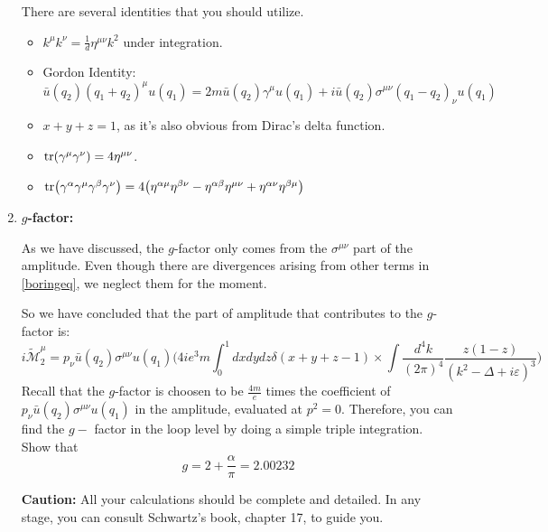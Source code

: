 \documentclass[11pt]{article}
\begin{document}
\begin{enumerate}
\begin{problem}{\points{-}}
	There are several identities that you should utilize.
	\begin{itemize}
		\item $k^\mu k^\nu = \frac{1}{d} \eta^{\mu\nu} k^2$ under integration.
		\item Gordon Identity:
		\[
		\bar{u}(q_2)(q_1+q_2)^\mu u(q_1) = 2m\bar{u}(q_2)\gamma^\mu u(q_1) + i \bar{u}(q_2) \sigma^{\mu\nu} (q_1-q_2)_\nu u(q_1) 
		\]
		\item $x+y+z=1$, as it's also obvious from Dirac's delta function.
		\item $\tr(\gamma^\mu\gamma^\nu) = 4\eta^{\mu\nu}$.
		\item $\tr (\gamma^\alpha\gamma^\mu\gamma^\beta\gamma^\nu) = 4\big(
		\eta^{\alpha\mu}\eta^{\beta\nu}-\eta^{\alpha\beta}\eta^{\mu\nu}+\eta^{\alpha\nu}\eta^{\beta\mu}
		\big)$
	\end{itemize}
		
\end{problem}

\item
\begin{problem}{\points{-}}
	\textbf{$g$-factor:}
	
	As we have discussed, the $g$-factor only comes from the $\sigma^{\mu\nu}$ part of the amplitude. Even though there are divergences arising from other terms in \ref{boringeq}, we neglect them for the moment.
	
	So we have concluded that the part of amplitude that contributes to the $g$-factor is:
	\begin{equation}
	i\tilde{\mathcal{M}}^\mu_2 = p_\nu \bar{u}(q_2) \sigma^{\mu\nu} u(q_1)\Big(
	4ie^3m \int_0^1 dxdydz \delta(x+y+z-1) \times \int \frac{d^4k}{(2\pi)^4} \frac{z(1-z)}{(k^2-\Delta+i\varepsilon)^3}
	\Big)
	\label{gfac}
	\end{equation}
	Recall that the $g$-factor is choosen to be $\frac{4m}{e}$ times the coefficient of  $p_\nu \bar{u}(q_2) \sigma^{\mu\nu} u(q_1)$ in the amplitude, evaluated at $p^2=0$. Therefore, you can find the $g-$ factor in the loop level by doing a simple triple integration. Show that 
	\[
	g = 2 + \frac{\alpha}{\pi} = 2.00232
	\]
\end{problem}
\textbf{Caution:} All your calculations should be complete and detailed. In any stage, you can consult Schwartz's book, chapter 17, to guide you.

\end{enumerate}

\newpage
\end{document}
